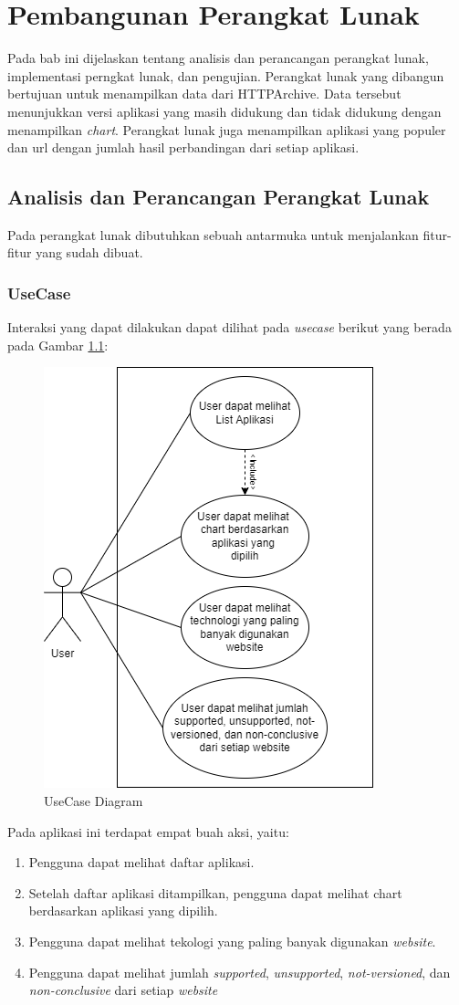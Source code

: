 \chapter{Pembangunan Perangkat Lunak}
\label{chap:pembangunan PL}
Pada bab ini dijelaskan tentang analisis dan perancangan perangkat lunak, implementasi perngkat lunak, dan pengujian. 
Perangkat lunak yang dibangun bertujuan untuk menampilkan data dari HTTPArchive. Data tersebut menunjukkan versi aplikasi yang masih didukung dan tidak didukung dengan menampilkan \textit{chart}. Perangkat lunak juga menampilkan aplikasi yang populer dan url dengan jumlah hasil perbandingan dari setiap aplikasi.  
\section{Analisis dan Perancangan Perangkat Lunak}
Pada perangkat lunak dibutuhkan sebuah antarmuka untuk menjalankan fitur-fitur yang sudah dibuat. 
\subsection{UseCase}
Interaksi yang dapat dilakukan dapat dilihat pada \textit{usecase} berikut yang berada pada Gambar \ref{fig:usecase_diagram}:
\begin{figure}[H]
	\centering  
	\includegraphics[scale=0.7]{Gambar/usecase.png}  
	\caption{UseCase Diagram} 
	\label{fig:usecase_diagram} 
\end{figure}
Pada aplikasi ini terdapat empat buah aksi, yaitu:
\begin{enumerate}
	\item Pengguna dapat melihat daftar aplikasi.
	\item Setelah daftar aplikasi ditampilkan, pengguna dapat melihat chart berdasarkan aplikasi yang dipilih.
	\item Pengguna dapat melihat tekologi yang paling banyak digunakan \textit{website}.
	\item Pengguna dapat melihat jumlah \textit{supported}, \textit{unsupported}, \textit{not-versioned}, dan \textit{non-conclusive} dari setiap \textit{website}
\end{enumerate}

